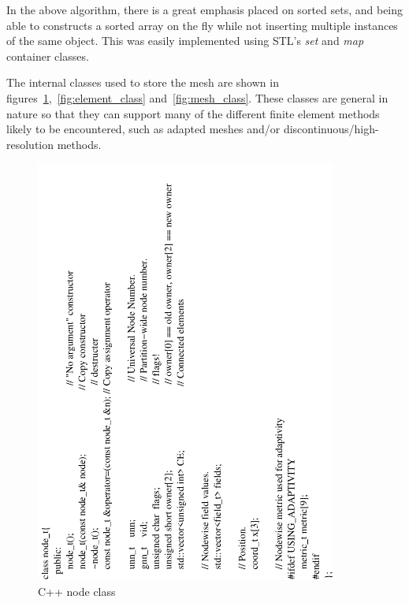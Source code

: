 \documentclass[11pt]{article}
\begin{document}
In the above algorithm, there is a great emphasis placed on sorted
sets, and being able to constructs a sorted array on the fly while
not inserting multiple instances of the same object. This was easily
implemented using STL's {\it set} and {\it map} container classes.

The internal classes used to store the mesh are shown in
figures~\ref{fig:node_class},~\ref{fig:element_class}
and~\ref{fig:mesh_class}. These classes are general in nature so that
they can support many of the different finite element methods likely
to be encountered, such as adapted meshes and/or
discontinuous/high-resolution methods.

\begin{figure}[h]\label{fig:node_class}
\centering
\includegraphics[height=140mm, angle=-90]{images/node_class}
\caption{C++ node class}
\end{figure} 
\end{document}
